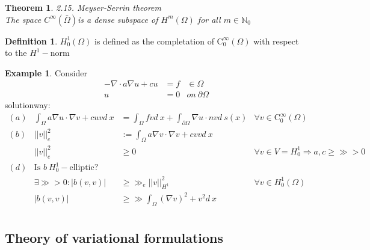 \documentclass[ngerman]{article}
\newtheorem*{theorem}{Theorem}
\theoremstyle{definition}
\newtheorem*{defi}{Definition}
\newtheorem*{exa}{Example}
\theoremstyle{remark}
\newcommand{\p}{\partial}
\newcommand{\NN}{\mathbb{N}}			%
\newcommand{\OO}{\Omega}
\newcommand{\cinf}{\tx{C}^\infty}
\newcommand{\drw}{\Rightarrow}			%
\newcommand{\tri}{\nabla}
\newcommand{\tx}[1]{\text{#1}}
\begin{document}
  \begin{theorem} 2.15. Meyser-Serrin theorem\\
    The space $C^\infty(\bar\OO)$is a dense subspace of $H^m(\OO)$ for all $m \in \NN_0$
  \end{theorem}
  \begin{defi}
    $H^1 _0 (\OO)$ is defined as the completation of $\cinf_0(\OO)$ with respect to the $H^1-$norm
  \end{defi}
  \begin{exa}
    Consider
    \begin{align*}
      -\tri \cdot a \tri u + cu & = f & \in \OO \\
      u                         & =0  & on\ \p\OO
    \end{align*}
    solutionway:
    \begin{align*}
      (a) & \int_\OO a \tri u \cdot \tri v + cuv d\ x & = \int_\OO fv d\ x + \int_{\p\OO} \tri u \cdot n v d\ s(x) & \forall v \in \cinf_0(\OO)                 \\
      (b) & ||v||_e ^2                                & := \int_\OO a \tri v \cdot \tri v + cvv d\ x                                                            \\
          & ||v||_e ^2                                & \geq 0                                                     & \forall v \in V=H_0 ^1 \drw a,c\geq \gg >0 \\
      (d) & \tx{Is }b \ H^1 _0-\tx{elliptic}?                                                                                                                   \\
          & \exists \gg>0:|b(v,v)|                    & \geq \gg_e||v||_{H^1}^2                                    & \forall v \in H_0 ^1(\OO)                  \\
          & |b(v,v)|                                  & \geq\gg\int_\OO (\tri v)^2 + v^2 d\ x                                                                   \\
    \end{align*}
  \end{exa}
  \subsection{Theory of variational formulations}
\end{document}
